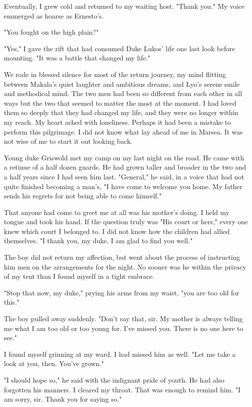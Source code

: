 \documentclass{article}
\begin{document}
Eventually, I grew cold and returned to my waiting host. "Thank you." My voice emmerged as hoarse as Ernesto's.

"You fought on the high plain?"

"Yes," I gave the rift that had consumed Duke Lukos' life one last look before mounting. "It was a battle that changed my life."

We rode in blessed silence for most of the return journey, my mind flitting between Makala's quiet laughter and ambitious dreams, and Lyo's serene smile and methodical mind. The two men had been so different from each other in all ways but the two that seemed to matter the most at the moment. I had loved them so deeply that they had changed my life, and they were no longer within my reach. My heart ached with loneliness. Perhaps it had been a mistake to perform this pilgrimage. I did not know what lay ahead of me in Marsea. It was not wise of me to start it out looking back.

\vspace{.5cm}

Young duke Griswold met my camp on my last night on the road. He came with a retinue of a half dozen guards. He had grown taller and broader in the two and a half years since I had seen him last. "General," he said, in a voice that had not quite finished becoming a man's, "I have come to welcome you home. My father sends his regrets for not being able to come himself."

That anyone had come to greet me at all was his mother's doing. I held my tongue and took his hand. If the question truly was "His court or hers," every one knew which court I belonged to. I did not know how the children had allied themselves. "I thank you, my duke. I am glad to find you well."

The boy did not return my affection, but went about the process of instructing him men on the arrangements for the night. No sooner was he within the privacy of my tent than I found myself in a tight embrace.

"Stop that now, my duke," prying his arms from my waist, "you are too old for this."

The boy pulled away suddenly. "Don't say that, sir. My mother is always telling me what I am too old or too young for. I've missed you. There is no one here to see."

I found myself grinning at my ward. I had missed him as well. "Let me take a look at you, then. You've grown."

"I should hope so," he said with the indignant pride of youth. He had also forgotten his manners. I cleared my throat. That was enough to remind him. "I am sorry, sir. Thank you for saying so."
\end{document}
